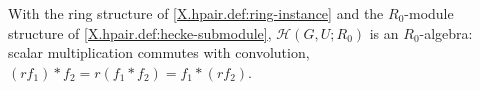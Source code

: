 With the ring structure of \cref{X.hpair.def:ring-instance} and the $R_0$-module structure of \cref{X.hpair.def:hecke-submodule}, $\mathcal H(G,U;R_0)$ is an $R_0$-algebra: scalar multiplication commutes with convolution, $(r f_1)*f_2=r(f_1*f_2)=f_1*(rf_2)$.
